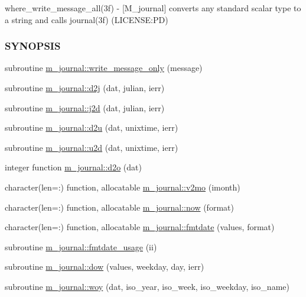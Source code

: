 \begin{DoxyCompactItemize}
\begin{DoxyCompactList}
where\+\_\+write\+\_\+message\+\_\+all(3f) -\/ \mbox{[}M\+\_\+journal\mbox{]} converts any standard scalar type to a string and calls journal(3f) (L\+I\+C\+E\+N\+SE\+:PD) \subsubsection*{S\+Y\+N\+O\+P\+S\+IS}\end{DoxyCompactList}\item 
subroutine \mbox{\hyperlink{namespacem__journal_aa86511a7c388f9286c282f6fa933ab58}{m\+\_\+journal\+::write\+\_\+message\+\_\+only}} (message)
\item 
subroutine \mbox{\hyperlink{namespacem__journal_a3978099ba1a861a6a67260c3060fc672}{m\+\_\+journal\+::d2j}} (dat, julian, ierr)
\item 
subroutine \mbox{\hyperlink{namespacem__journal_a3856fe36ea3b9de491627294a1488918}{m\+\_\+journal\+::j2d}} (dat, julian, ierr)
\item 
subroutine \mbox{\hyperlink{namespacem__journal_a9cd7f892071e8ddfde7e45fea077c3ce}{m\+\_\+journal\+::d2u}} (dat, unixtime, ierr)
\item 
subroutine \mbox{\hyperlink{namespacem__journal_a9521857f9c0a6ef8c85edcf9a3af1b07}{m\+\_\+journal\+::u2d}} (dat, unixtime, ierr)
\item 
integer function \mbox{\hyperlink{namespacem__journal_ac12ae324e8c89f7400fb9ef0a581dc00}{m\+\_\+journal\+::d2o}} (dat)
\item 
character(len=\+:) function, allocatable \mbox{\hyperlink{namespacem__journal_a1941b83a2253bc58165639f256827534}{m\+\_\+journal\+::v2mo}} (imonth)
\item 
character(len=\+:) function, allocatable \mbox{\hyperlink{namespacem__journal_a4a421ecf44cfb86feeee17c7505d7b98}{m\+\_\+journal\+::now}} (format)
\item 
character(len=\+:) function, allocatable \mbox{\hyperlink{namespacem__journal_a626580cd351557ac2d107fd2a97a388f}{m\+\_\+journal\+::fmtdate}} (values, format)
\item 
subroutine \mbox{\hyperlink{namespacem__journal_aad40dcd3091bc958ddd427db862e28b5}{m\+\_\+journal\+::fmtdate\+\_\+usage}} (ii)
\item 
subroutine \mbox{\hyperlink{namespacem__journal_a40b5e01c631024472f21521c9705881a}{m\+\_\+journal\+::dow}} (values, weekday, day, ierr)
\item 
subroutine \mbox{\hyperlink{namespacem__journal_a1ee1cbb181ac428b54cd9e7acaba3be9}{m\+\_\+journal\+::woy}} (dat, iso\+\_\+year, iso\+\_\+week, iso\+\_\+weekday, iso\+\_\+name)

\end{DoxyCompactItemize}
